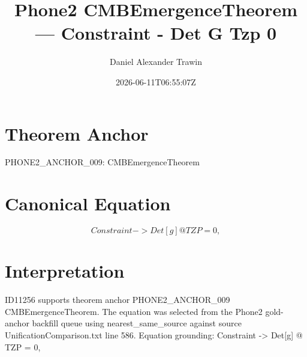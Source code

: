 \documentclass[11pt]{article}
\title{Phone2 CMBEmergenceTheorem — Constraint - Det G Tzp 0}
\author{Daniel Alexander Trawin}
\date{2026-06-11T06:55:07Z}
\begin{document}
\maketitle
\section*{Theorem Anchor}
PHONE2_ANCHOR_009: CMBEmergenceTheorem
\section*{Canonical Equation}
\[
Constraint -> Det[g] @ TZP = 0,
\]
\section*{Interpretation}
ID11256 supports theorem anchor PHONE2_ANCHOR_009 CMBEmergenceTheorem. The equation was selected from the Phone2 gold-anchor backfill queue using nearest_same_source against source UnificationComparison.txt line 586. Equation grounding: Constraint -> Det[g] @ TZP = 0,
\end{document}
